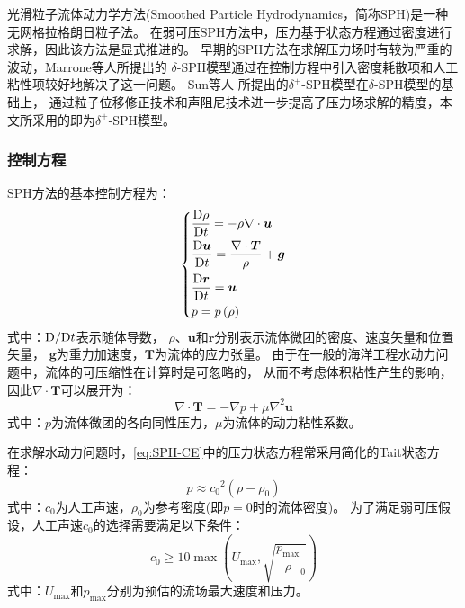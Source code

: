 光滑粒子流体动力学方法(Smoothed Particle Hydrodynamics，简称SPH)是一种无网格拉格朗日粒子法。%
在弱可压SPH方法中，压力基于状态方程通过密度进行求解\cite{monaghanSimulatingFreeSurface1994}，因此该方法是显式推进的。%
早期的SPH方法在求解压力场时有较为严重的波动，Marrone等人\cite{marroneDSPHModelSimulating2011}所提出的%
$\delta$-SPH模型通过在控制方程中引入密度耗散项和人工粘性项较好地解决了这一问题。%
Sun等人\cite{sunDplusSPHModelSimple2017,sunInclusionAcousticDamper2023}%
所提出的$\delta^+$-SPH模型在$\delta$-SPH模型的基础上，%
通过粒子位移修正技术和声阻尼技术进一步提高了压力场求解的精度，本文所采用的即为$\delta^+$-SPH模型。

\subsubsection{
  \texorpdfstring{控制方程} %
  {\thesubsubsection 控制方程} %
}
\label{sssec:SPH-控制方程}

SPH方法的基本控制方程为：
\begin{equation}
  \left\{
    \begin{aligned}
      & \frac{{\rm{D}}\rho}{{\rm{D}}t} = - \rho \nabla \cdot \bm{u} \\
      & \frac{{\rm{D}}\bm{u}}{{\rm{D}}t} = \frac{\nabla \cdot \bm{T}}{\rho} + \bm{g} \\
      & \frac{{\rm{D}}\bm{r}}{{\rm{D}}t} = \bm{u} \\
      & p = p\left(\rho\right)
    \end{aligned}
  \right.
  \label{eq:SPH-CE}
\end{equation}
式中：${\rm{D}}/{\rm{D}}t$表示随体导数，%
$\rho$、$\bm{u}$和$\bm{r}$分别表示流体微团的密度、速度矢量和位置矢量，%
$\bm{g}$为重力加速度，$\bm{T}$为流体的应力张量。%
由于在一般的海洋工程水动力问题中，流体的可压缩性在计算时是可忽略的，%
从而不考虑体积粘性产生的影响，因此$\nabla \cdot \bm{T}$可以展开为：
\begin{equation}
  \nabla \cdot \bm{T} = - \nabla p + \mu \nabla^2 \bm{u}
\end{equation}
式中：$p$为流体微团的各向同性压力，$\mu$为流体的动力粘性系数。

在求解水动力问题时，\cref{eq:SPH-CE}中的压力状态方程常采用简化的Tait状态方程\cite{antuonoFreesurfaceFlowsSolved2010}：
\begin{equation}
  p \approx {c_0}^2 \left(\rho - \rho_0\right)
\end{equation}
式中：$c_0$为人工声速，$\rho_0$为参考密度(即$p = 0$时的流体密度)。%
为了满足弱可压假设，人工声速$c_0$的选择需要满足以下条件\cite{antuonoEnergyBalanceDSPH2015}：
\begin{equation}
  c_0 \ge 10 \max \left(U_{\max}, \sqrt{\frac{p_{\max}}\rho_0}\right)
\end{equation}
式中：$U_{\max}$和$p_{\max}$分别为预估的流场最大速度和压力。

